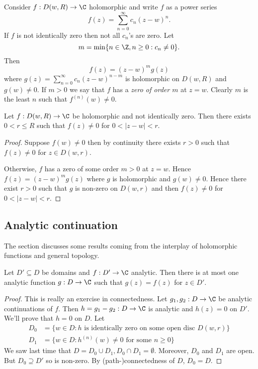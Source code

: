 \documentclass[a4paper]{article}
\begin{document}
Consider \(f: D(w, R) \to \C\) holomorphic and write \(f\) as a power series
\[
  f(z) = \sum_{n = 0}^\infty c_n(z - w)^n.
\]
If \(f\) is not identically zero then not all \(c_n\)'s are zero. Let
\[
  m = \min\{n \in \Z, n \geq 0: c_n \neq 0\}.
\]
Then
\[
  f(z) = (z - w)^m g(z)
\]
where \(g(z) = \sum_{n = 0}^\infty c_n(z - w)^{n - m}\) is holomorphic on \(D(w, R)\) and \(g(w) \neq 0\). If \(m > 0\) we say that \(f\) has a \emph{zero of order \(m\)} at \(z = w\). Clearly \(m\) is the least \(n\) such that \(f^{(n)}(w) \neq 0\).

\begin{theorem}
  \label{thm:principle of isolated zeros}
  Let \(f: D(w, R) \to \C\) be holomorphic and not identically zero. Then there exists \(0 < r \leq R\) such that \(f(z) \neq 0\) for \(0 < |z - w| < r\).
\end{theorem}

\begin{proof}
  Suppose \(f(w) \neq 0\) then by continuity there exists \(r > 0\) such that \(f(z) \neq 0\) for \(z \in D(w, r)\).

  Otherwise, \(f\) has a zero of some order \(m > 0\) at \(z = w\). Hence \(f(z) = (z - w)^mg(z)\) where \(g\) is holomorphic and \(g(w) \neq 0\). Hence there exist \(r > 0\) such that \(g\) is non-zero on \(D(w, r)\) and then \(f(z) \neq 0\) for \(0 < |z - w| < r\).
\end{proof}

\subsection{Analytic continuation}

The section discusses some results coming from the interplay of holomorphic functions and general topology.

\begin{theorem}
  Let \(D' \subseteq D\) be domains and \(f: D' \to \C\) analytic. Then there is at most one analytic function \(g: D \to \C\) such that \(g(z) = f(z)\) for \(z \in D'\).
\end{theorem}

\begin{proof}
  This is really an exercise in connectedness. Let \(g_1, g_2: D \to \C\) be analytic continuations of \(f\). Then \(h = g_1 - g_2: D \to \C\) is analytic and \(h(z) = 0\) on \(D'\). We'll prove that \(h = 0\) on \(D\). Let
  \begin{align*}
    D_0 &= \{w \in D: h \text{ is identically zero on some open disc } D(w, r)\} \\
    D_1 &= \{w \in D: h^{(n)}(w) \neq 0 \text{ for some } n \geq 0\}
  \end{align*}
  We saw last time that \(D = D_0 \cup D_1, D_0 \cap D_1 = \emptyset\). Moreover, \(D_0\) and \(D_1\) are open. But \(D_0 \supseteq D'\) so is non-zero. By (path-)connectedness of \(D\), \(D_0 = D\).
\end{proof}
\end{document}
